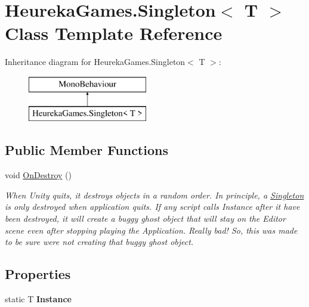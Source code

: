 \hypertarget{class_heureka_games_1_1_singleton}{}\section{Heureka\+Games.\+Singleton$<$ T $>$ Class Template Reference}
\label{class_heureka_games_1_1_singleton}
Inheritance diagram for Heureka\+Games.\+Singleton$<$ T $>$\+:\begin{figure}[H]
\begin{center}
\leavevmode
\includegraphics[height=2.000000cm]{class_heureka_games_1_1_singleton}
\end{center}
\end{figure}
\subsection*{Public Member Functions}
\begin{DoxyCompactItemize}
\item 
void \hyperlink{class_heureka_games_1_1_singleton_adbd535470ab8239e2926a8016e2aea53}{On\+Destroy} ()
\begin{DoxyCompactList}\small\item\em When Unity quits, it destroys objects in a random order. In principle, a \hyperlink{class_heureka_games_1_1_singleton}{Singleton} is only destroyed when application quits. If any script calls Instance after it have been destroyed, it will create a buggy ghost object that will stay on the Editor scene even after stopping playing the Application. Really bad! So, this was made to be sure we\textquotesingle{}re not creating that buggy ghost object. \end{DoxyCompactList}\end{DoxyCompactItemize}
\subsection*{Properties}
\begin{DoxyCompactItemize}
\item 
\mbox{\label{class_heureka_games_1_1_singleton_af345846f15adf4a8a9376717d2851df7}} 
static T {\bfseries Instance}
\end{DoxyCompactItemize}
